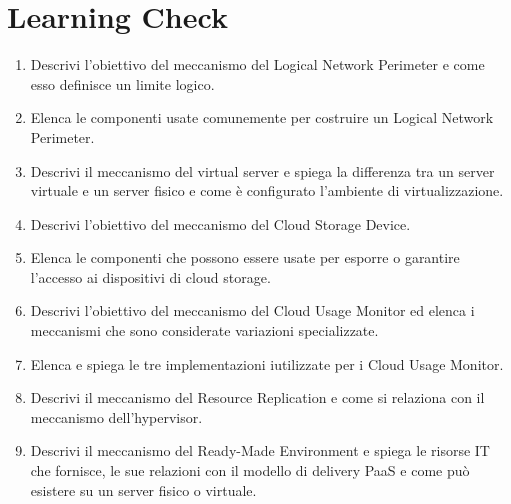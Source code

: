 \section{Learning Check}
\begin{enumerate}
    \item Descrivi l'obiettivo del meccanismo del Logical Network Perimeter e come esso definisce un limite logico.
    \item Elenca le componenti usate comunemente per costruire un Logical Network Perimeter.
    \item Descrivi il meccanismo del virtual server e spiega la differenza tra un server virtuale e un server fisico e come è configurato l'ambiente di virtualizzazione.
    \item Descrivi l'obiettivo del meccanismo del Cloud Storage Device.
    \item Elenca le componenti che possono essere usate per esporre o garantire l'accesso ai dispositivi di cloud storage.
    \item Descrivi l'obiettivo del meccanismo del Cloud Usage Monitor ed elenca i meccanismi che sono considerate variazioni specializzate.
    \item Elenca e spiega le tre implementazioni iutilizzate per i Cloud Usage Monitor.
    \item Descrivi il meccanismo del Resource Replication e come si relaziona con il meccanismo dell'hypervisor.
    \item Descrivi il meccanismo del Ready-Made Environment e spiega le risorse IT che fornisce, le sue relazioni con il modello di delivery PaaS e come può esistere su un server fisico o virtuale.
\end{enumerate}
